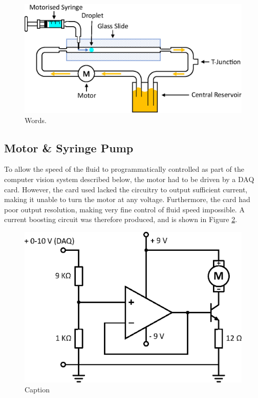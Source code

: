\documentclass{physics_article_B}
\begin{document}
            \begin{figure}[H]
            \centering
            \hspace*{2.0cm}\includegraphics[scale=0.8]{Figures/Fluid.eps}
            \captionsetup{justification=centering}
            \caption{Words.} 	
            \label{fig:basic}
            \end{figure} 

    \subsection{Motor \& Syringe Pump\label{sect:method:motor}}

        To allow the speed of the fluid to programmatically controlled as part of the computer vision system described below, the motor had to be driven by a DAQ card. However, the card used lacked the circuitry to output sufficient current, making it unable to turn the motor at any voltage. Furthermore, the card had poor output resolution, making very fine control of fluid speed impossible. A current boosting circuit was therefore produced, and is shown in Figure \ref{fig:MotorCircuit}.  
        
            \begin{figure}[H]
                \centering
                \hspace*{-1.8cm}\includegraphics[scale=0.8]{Figures/MotorCircuit.eps}
                \caption{Caption}
                \label{fig:MotorCircuit}
            \end{figure}
        
\end{document}
